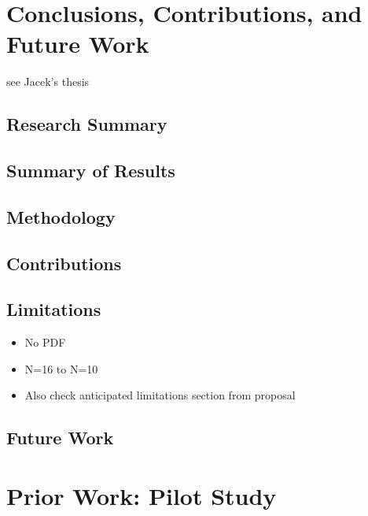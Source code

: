 \documentclass[a4paper, nobind]{templates/ociamthesis}
\providecommand{\tightlist}{%
  \setlength{\itemsep}{0pt}\setlength{\parskip}{0pt}}
\begin{document}
\hypertarget{conclusions-contributions-and-future-work}{%
\chapter{Conclusions, Contributions, and Future Work}\label{conclusions-contributions-and-future-work}}

see Jacek's thesis

\hypertarget{research-summary}{%
\section{Research Summary}\label{research-summary}}

\hypertarget{summary-of-results}{%
\section{Summary of Results}\label{summary-of-results}}

\hypertarget{methodology}{%
\section{Methodology}\label{methodology}}

\hypertarget{contributions}{%
\section{Contributions}\label{contributions}}

\hypertarget{limitations}{%
\section{Limitations}\label{limitations}}

\begin{itemize}
\tightlist
\item
  No PDF
\item
  N=16 to N=10
\item
  Also check anticipated limitations section from proposal
\end{itemize}

\hypertarget{future-work}{%
\section{Future Work}\label{future-work}}

\startappendices

\hypertarget{ch_pilot_study}{%
\chapter{Prior Work: Pilot Study}\label{ch_pilot_study}}
\end{document}
